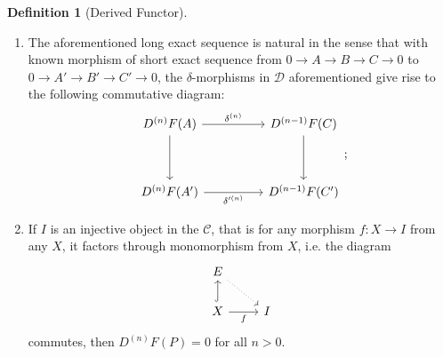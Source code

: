 \documentclass[10pt]{report}
\theoremstyle{definition}
\newtheorem{definition}{Definition}
\begin{document}
\begin{definition}[Derived Functor]
\begin{enumerate}
\begin{enumerate}
\item The aforementioned long exact sequence is natural in the sense that with known morphism of short exact sequence from $0\to A\to B\to C\to0$ to $0\to A'\to B'\to C'\to0$, the $\delta$-morphisms in $\mathcal{D}$ aforementioned give rise to the following commutative diagram:
        $$
        \begin{tikzcd}
D^{(n)}F(A) \arrow[rr, "\delta^{(n)}"] \arrow[dd] &  & D^{(n-1)}F(C) \arrow[dd] \\
                                                                         &  &                                                 \\
D^{(n)}F(A') \arrow[rr, "{\delta'^{(n)}}"']       &  & D^{(n-1)}F(C')
\end{tikzcd};
        $$
\item If $I$ is an injective object in the $\mathcal{C}$, that is for any morphism $f:X\to I$ from any $X$, it factors through monomorphism from $X$, i.e. the diagram
    $$
    \begin{tikzcd}
E \arrow[rd, dotted]              &   \\
X \arrow[r, "f"'] \arrow[u, hook] & I
\end{tikzcd}
    $$
    commutes, then $D^{(n)}F(P)=0$ for all $n>0$.
\end{enumerate}
\end{enumerate}
\end{definition}
\end{document}
